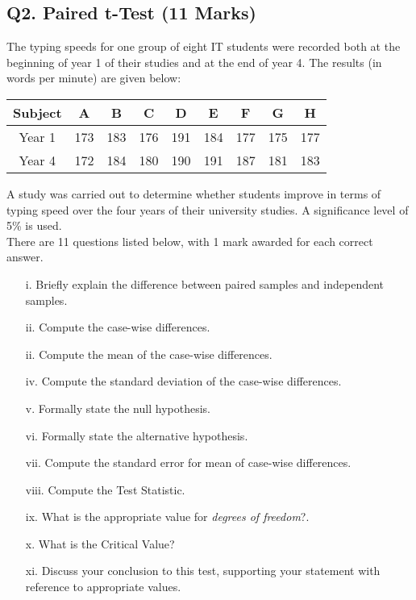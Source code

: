 \documentclass[a4paper,12pt]{article}
\begin{document}
  \subsection*{Q2. Paired t-Test (11 Marks)}

The typing speeds for one group of eight IT students were recorded both at the beginning of year 1 of their studies and at the end of year 4. The results (in words per minute) are given below:
  
  \begin{center}
\begin{tabular}{|c|c|c|c|c|c|c|c|c|}
\hline
Subject& A& B& C& D& E &F &G &H \\ \hline
Year 1 &173& 183& 176& 191& 184 &177& 175& 177\\ \hline
Year 4 &172 &184 &180 &190& 191& 187& 181& 183\\ \hline
\end{tabular}
\end{center}


A study was carried out to determine whether students improve in terms of typing speed over the four years of their university studies. A significance level of 5\% is used.\\
\bigskip
There are 11 questions listed below, with 1 mark awarded for each correct answer.
\begin{itemize}
\item[i.] Briefly explain the difference between paired samples and independent samples.
\item[ii.] Compute the case-wise differences.
\item[ii.] Compute the mean of the case-wise differences.
\item[iv.] Compute the standard deviation of the case-wise differences.
\item[v.] Formally state the null hypothesis.
\item[vi.] Formally state the alternative hypothesis.
\item[vii.] Compute the standard error for mean of case-wise differences.
\item[viii.] Compute the Test Statistic.
\item[ix.] What is the appropriate value for \textit{degrees of freedom}?.
\item[x.] What is the Critical Value?
  \item[xi.] Discuss your conclusion to this test, supporting your statement with reference to appropriate values.
\end{itemize}
\end{document}
